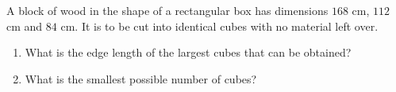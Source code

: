A block of wood in the shape of a rectangular box has dimensions $168$ cm, $112$ cm and $84$ cm. It is to be cut into identical cubes with no material left over.
\begin{enumerate}
\item[(a)] What is the edge length of the largest cubes that can be obtained?
\item[(b)] What is the smallest possible number of cubes?
\end{enumerate}
